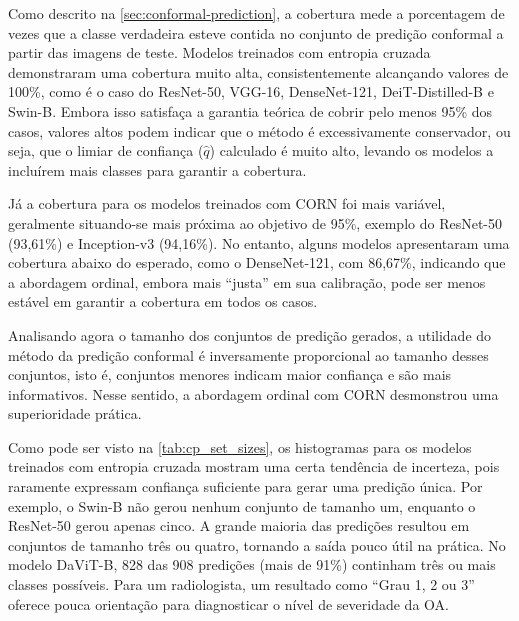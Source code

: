 Como descrito na \autoref{sec:conformal-prediction}, a cobertura mede a porcentagem de vezes que a classe verdadeira esteve contida no conjunto de predição conformal a partir das imagens de teste. Modelos treinados com entropia cruzada demonstraram uma cobertura muito alta, consistentemente alcançando valores de 100\%, como é o caso do ResNet-50, VGG-16, DenseNet-121, DeiT-Distilled-B e Swin-B. Embora isso satisfaça a garantia teórica de cobrir pelo menos 95\% dos casos, valores altos podem indicar que o método é excessivamente conservador, ou seja, que o limiar de confiança ($\hat{q}$) calculado é muito alto, levando os modelos a incluírem mais classes para garantir a cobertura.

Já a cobertura para os modelos treinados com CORN foi mais variável, geralmente situando-se mais próxima ao objetivo de 95\%, exemplo do ResNet-50 (93,61\%) e Inception-v3 (94,16\%). No entanto, alguns modelos apresentaram uma cobertura abaixo do esperado, como o DenseNet-121, com 86,67\%, indicando que a abordagem ordinal, embora mais ``justa'' em sua calibração, pode ser menos estável em garantir a cobertura em todos os casos.

Analisando agora o tamanho dos conjuntos de predição gerados, a utilidade do método da predição conformal é inversamente proporcional ao tamanho desses conjuntos, isto é, conjuntos menores indicam maior confiança e são mais informativos. Nesse sentido, a abordagem ordinal com CORN desmonstrou uma superioridade prática.

Como pode ser visto na \autoref{tab:cp_set_sizes}, os histogramas para os modelos treinados com entropia cruzada mostram uma certa tendência de incerteza, pois raramente expressam confiança suficiente para gerar uma predição única. Por exemplo, o Swin-B não gerou nenhum conjunto de tamanho um, enquanto o ResNet-50 gerou apenas cinco. A grande maioria das predições resultou em conjuntos de tamanho três ou quatro, tornando a saída pouco útil na prática. No modelo DaViT-B, 828 das 908 predições (mais de 91\%) continham três ou mais classes possíveis. Para um radiologista, um resultado como ``Grau 1, 2 ou 3'' oferece pouca orientação para diagnosticar o nível de severidade da OA.

